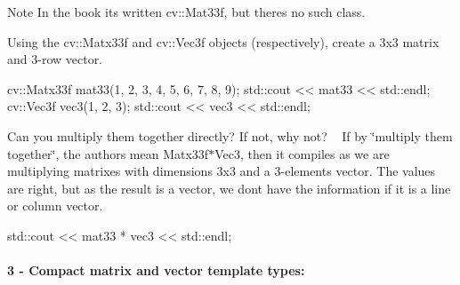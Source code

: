 \begin{DoxyNote}{Note}
In the book it\textquotesingle{}s written {\ttfamily cv\+::\+Mat33f}, but there\textquotesingle{}s no such class.
\end{DoxyNote}

\begin{DoxyEnumerate}
\item Using the {\ttfamily cv\+::\+Matx33f} and {\ttfamily cv\+::\+Vec3f} objects (respectively), create a 3x3 matrix and 3-\/row vector. 
\begin{DoxyCodeInclude}
    cv::Matx33f mat33(1, 2, 3, 4, 5, 6, 7, 8, 9);
    std::cout << mat33 << std::endl;
    cv::Vec3f vec3(1, 2, 3);
    std::cout << vec3 << std::endl;
\end{DoxyCodeInclude}

\item Can you multiply them together directly? If not, why not? ~\newline
 If by \char`\"{}multiply them together\char`\"{}, the authors mean Matx33f$\ast$\+Vec3, then it compiles as we are multiplying matrixes with dimensions 3x3 and a 3-\/elements vector. The values are right, but as the result is a vector, we don\textquotesingle{}t have the information if it is a line or column vector. 
\begin{DoxyCodeInclude}
    std::cout << mat33 * vec3 << std::endl;
\end{DoxyCodeInclude}
 \paragraph*{3 -\/ Compact matrix and vector template types\+:}
\end{DoxyEnumerate}


